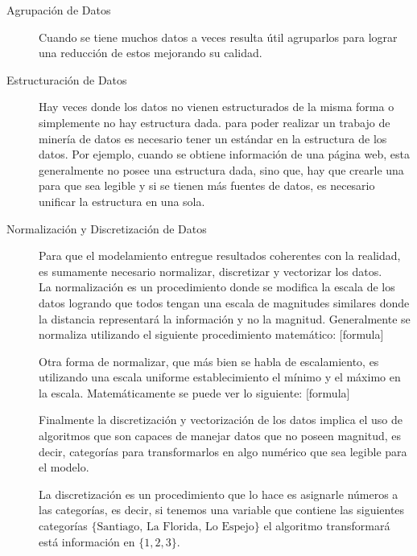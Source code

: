 \begin{description}
  \item[Agrupación de Datos]
  Cuando se tiene muchos datos a veces resulta útil agruparlos para lograr una reducción de estos mejorando su calidad.
  \item[Estructuración de Datos]
  Hay veces donde los datos no  vienen estructurados de la misma forma o simplemente no hay estructura dada. para poder realizar un trabajo de minería de datos es necesario tener un estándar en la estructura de los datos. Por ejemplo, cuando se obtiene información de una página web, esta generalmente no posee una estructura dada, sino que, hay que crearle una para que sea legible y si se tienen más fuentes de datos, es necesario unificar la estructura en una sola.
  \item[Normalización y Discretización de Datos]
  Para que el modelamiento entregue resultados coherentes con la realidad, es sumamente necesario normalizar, discretizar y vectorizar los datos.\\
  La normalización es un procedimiento donde se modifica la escala de los datos logrando que todos tengan una escala de magnitudes similares donde la distancia representará la información y no la magnitud. Generalmente se normaliza utilizando el siguiente procedimiento matemático:
  [formula]
  
  Otra forma de normalizar, que más bien se habla de escalamiento, es utilizando una escala uniforme establecimiento el mínimo y el máximo en la escala. Matemáticamente se puede ver lo siguiente:
  [formula]
  
  Finalmente la discretización y vectorización de los datos implica el uso de algoritmos que son capaces de manejar datos que no poseen magnitud, es decir, categorías para transformarlos en algo numérico que sea legible para el modelo.
  
  La discretización es un procedimiento que lo hace es asignarle números a las categorías, es decir, si tenemos una variable que contiene las siguientes categorías $\{\textrm{Santiago, La Florida, Lo Espejo}\}$ el algoritmo transformará está información en $\{1,2,3\}$. 
  

\end{description}
